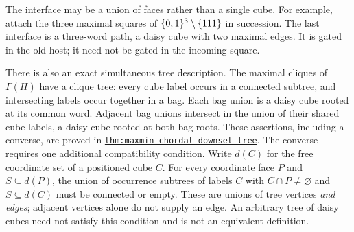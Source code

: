 The interface may be a union of faces rather than a single cube.
For example, attach the three maximal squares of
$\{0,1\}^3\setminus\{111\}$ in succession. The last interface is a
three-word path, a daisy cube with two maximal edges. It is gated in the
old host; it need not be gated in the incoming square.

There is also an exact simultaneous tree description. The maximal cliques
of $\Gamma(H)$ have a clique tree: every cube label occurs in a connected
subtree, and intersecting labels occur together in a bag. Each bag union
is a daisy cube rooted at its common word. Adjacent bag unions intersect
in the union of their shared cube labels, a daisy cube rooted at both bag
roots. These assertions, including a converse, are proved in
\href{../maxmin-forbidden/sections/chordal_downset_tree.tex}
{\nolinkurl{thm:maxmin-chordal-downset-tree}}.
The converse requires one additional compatibility condition. Write $d(C)$
for the free coordinate set of a positioned cube $C$. For every
coordinate face $P$ and $S\subseteq d(P)$, the union of occurrence subtrees
of labels $C$ with $C\cap P\ne\varnothing$ and $S\subseteq d(C)$ must
be connected or empty. These are unions of tree vertices \emph{and edges};
adjacent vertices alone do not supply an edge. An arbitrary tree of daisy
cubes need not satisfy this condition and is not an equivalent definition.

